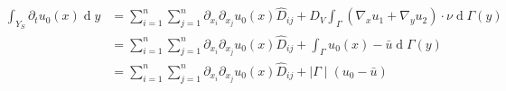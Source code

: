 \documentclass[10pt, a4paper]{article}
\begin{document}
 \begin{align}
 \label{integral2}
 \int_{Y_S}\partial_t u_0(x)\operatorname{d}y &= \sum_{i=1}^n\sum_{j=1}^n \partial_{x_i}\partial_{x_j}u_0(x) \hat D_{ij}+D_V \int_\Gamma (\nabla_x u_1 + \nabla_y u_2) \cdot \nu \operatorname{d} \Gamma(y)\\
  &= \sum_{i=1}^n\sum_{j=1}^n \partial_{x_i}\partial_{x_j}u_0(x) \hat D_{ij}+\int_\Gamma u_0(x) - \bar{u} \operatorname{d} \Gamma(y)\\
  &= \sum_{i=1}^n\sum_{j=1}^n \partial_{x_i}\partial_{x_j}u_0(x) \hat D_{ij}
  + \mid\Gamma\mid(u_0 - \bar{u})
 \end{align}
% 
% 
% 
% 
%  
 
 
%  
%  
 
\end{document}
